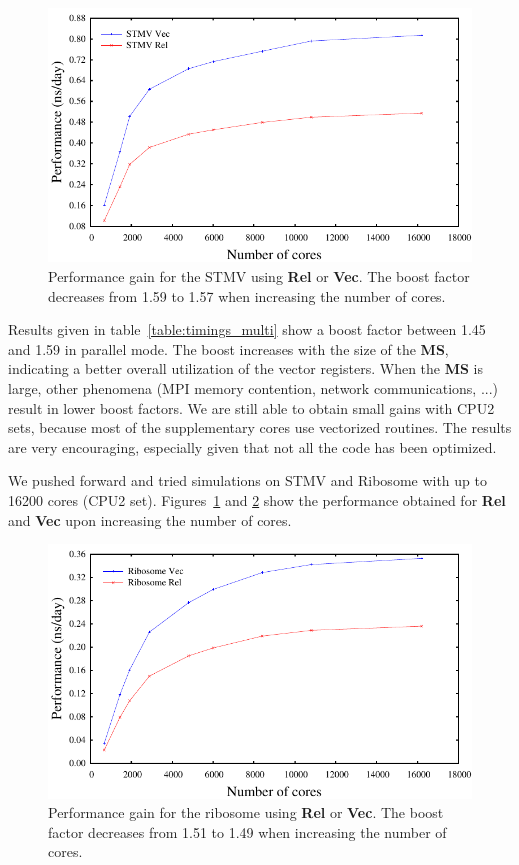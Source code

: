 \documentclass[9pt,comparison]{livecoms}
\begin{document}
\begin{figure}[h]
\centering
\includegraphics[scale=0.7]{stmv.pdf}
\caption{Performance gain for the STMV using \textbf{Rel} or \textbf{Vec}. The boost factor decreases from 1.59 to 1.57 when increasing the number of cores.}
\label{fig:stmv}
\end{figure}
Results given in table~\ref{table:timings_multi} show a boost factor between 1.45 and 1.59 in parallel mode. The boost increases with the size of the \textbf{MS}, indicating a better overall utilization of the vector registers. When the \textbf{MS} is large, other phenomena (MPI memory contention, network communications, ...) result in lower boost factors. We are still able to obtain small gains with CPU2 sets, because most of the supplementary cores use vectorized routines. The results are very encouraging, especially given that not all the code has been optimized.

We pushed forward and tried simulations on STMV and Ribosome with up to 16200 cores (CPU2 set). Figures~\ref{fig:stmv} and \ref{fig:ribosome} show the performance obtained for \textbf{Rel} and \textbf{Vec} upon increasing the number of cores.

\begin{figure}[h]
\centering
\includegraphics[scale=0.7]{ribosome.pdf}
\caption{Performance gain for the ribosome using \textbf{Rel} or \textbf{Vec}. The boost factor decreases from 1.51 to 1.49 when increasing the number of cores.}
\label{fig:ribosome}
\end{figure}
\end{document}
